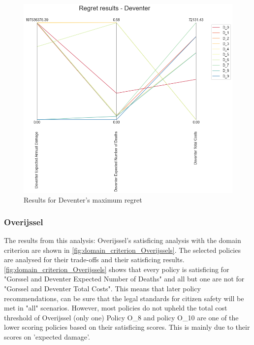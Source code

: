\begin{figure}[H]
\begin{minipage}[b]{0.4\textwidth}
    \includegraphics[width=1.2\textwidth]{report/figures/results/regret_figure_Deventer.png}
    \caption{Results for Deventer's maximum regret}
    \label{fig:regret_Deventers}
  \end{minipage}
\end{figure}

\subsubsection{Overijssel}
The results from this analysis: Overijssel's satisficing analysis with the domain criterion are shown in \autoref{fig:domain_criterion_Overijssels}. The selected policies are analysed for their trade-offs and their satisficing results. \newline
\autoref{fig:domain_criterion_Overijssels} shows that every policy is satisficing for "Gorssel and Deventer Expected Number of Deaths" and all but one are not for "Gorssel and Deventer Total Costs". This means that later policy recommendations, can be sure that the legal standards for citizen safety will be met in "all" scenarios. However, most policies do not upheld the total cost threshold of Overijssel (only one) \newline 
Policy O\_8 and policy O\_10 are one of the lower scoring policies based on their satisficing scores. This is mainly due to their scores on 'expected damage'. 

